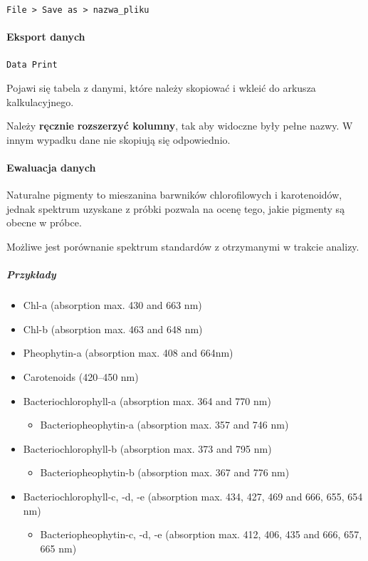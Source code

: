 \documentclass[
  letterpaper,
  DIV=11,
  numbers=noendperiod]{scrreprt}
\let\oldparagraph\paragraph
\renewcommand{\paragraph}[1]{\oldparagraph{#1}\mbox{}}
\let\oldsubparagraph\subparagraph
\renewcommand{\subparagraph}[1]{\oldsubparagraph{#1}\mbox{}}
\providecommand{\tightlist}{%
  \setlength{\itemsep}{0pt}\setlength{\parskip}{0pt}}\usepackage{longtable,booktabs,array}
\begin{document}
\texttt{File\ \textgreater{}\ Save\ as\ \textgreater{}\ nazwa\_pliku}

\hypertarget{eksport-danych}{%
\paragraph{Eksport danych}\label{eksport-danych}}

\texttt{Data\ Print}

Pojawi się tabela z danymi, które należy skopiować i wkleić do arkusza
kalkulacyjnego.

Należy \textbf{ręcznie} \textbf{rozszerzyć kolumny}, tak aby widoczne
były pełne nazwy. W innym wypadku dane nie skopiują się odpowiednio.

\hypertarget{ewaluacja-danych}{%
\paragraph{Ewaluacja danych}\label{ewaluacja-danych}}

Naturalne pigmenty to mieszanina barwników chlorofilowych i
karotenoidów, jednak spektrum uzyskane z próbki pozwala na ocenę tego,
jakie pigmenty są obecne w próbce.

Możliwe jest porównanie spektrum standardów z otrzymanymi w trakcie
analizy.

\hypertarget{przykux142ady}{%
\subparagraph{Przykłady}\label{przykux142ady}}

\begin{itemize}
\item
  Chl-a (absorption max. 430 and 663 nm)
\item
  Chl-b (absorption max. 463 and 648 nm)
\item
  Pheophytin-a (absorption max. 408 and 664nm)
\item
  Carotenoids (420--450 nm)
\item
  Bacteriochlorophyll-a (absorption max. 364 and 770 nm)

  \begin{itemize}
  \tightlist
  \item
    Bacteriopheophytin-a (absorption max. 357 and 746 nm)
  \end{itemize}
\item
  Bacteriochlorophyll-b (absorption max. 373 and 795 nm)

  \begin{itemize}
  \tightlist
  \item
    Bacteriopheophytin-b (absorption max. 367 and 776 nm)
  \end{itemize}
\item
  Bacteriochlorophyll-c, -d, -e (absorption max. 434, 427, 469 and 666,
  655, 654 nm)

  \begin{itemize}
  \tightlist
  \item
    Bacteriopheophytin-c, -d, -e (absorption max. 412, 406, 435 and 666,
    657, 665 nm)
  \end{itemize}
\end{itemize}
\end{document}

